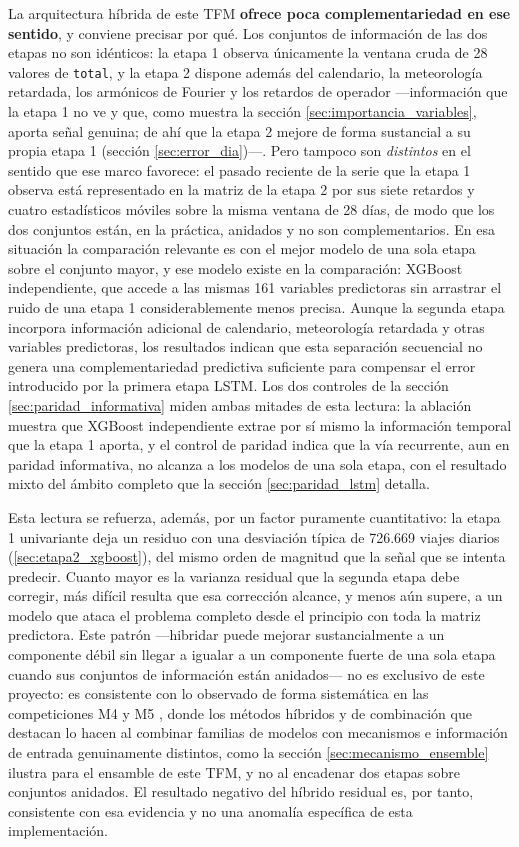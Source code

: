 La arquitectura híbrida de este TFM \textbf{ofrece poca complementariedad en ese sentido},
y conviene precisar por qué. Los conjuntos de información de las dos etapas no son
idénticos: la etapa 1 observa únicamente la ventana cruda de 28 valores de \texttt{total},
y la etapa 2 dispone además del calendario, la meteorología retardada, los armónicos de
Fourier y los retardos de operador —información que la etapa 1 no ve y que, como muestra
la sección \ref{sec:importancia_variables}, aporta señal genuina; de ahí que la etapa 2
mejore de forma sustancial a su propia etapa 1 (sección \ref{sec:error_dia})—. Pero
tampoco son \emph{distintos} en el sentido que ese marco favorece: el pasado reciente de la
serie que la etapa 1 observa está representado en la matriz de la etapa 2 por sus siete
retardos y cuatro estadísticos móviles sobre la misma ventana de 28 días, de modo que los
dos conjuntos están, en la práctica, anidados y no son complementarios. En esa situación la
comparación relevante es con el mejor modelo de una sola etapa sobre el conjunto mayor, y
ese modelo existe en la comparación: XGBoost independiente, que accede a las mismas 161
variables predictoras sin arrastrar el ruido de una etapa 1 considerablemente menos precisa. Aunque la segunda etapa incorpora información adicional de
calendario, meteorología retardada y otras variables predictoras, los resultados indican
que esta separación secuencial no genera una complementariedad predictiva suficiente para
compensar el error introducido por la primera etapa LSTM. Los dos controles de la sección
\ref{sec:paridad_informativa} miden ambas mitades de esta lectura: la ablación muestra que
XGBoost independiente extrae por sí mismo la información temporal que la etapa 1 aporta,
y el control de paridad indica que la vía recurrente, aun en paridad informativa, no
alcanza a los modelos de una sola etapa, con el resultado mixto del ámbito completo que la
sección \ref{sec:paridad_lstm} detalla.

Esta lectura se refuerza, además, por un factor puramente cuantitativo: la etapa 1
univariante deja un residuo con una desviación típica de 726.669 viajes diarios
(\ref{sec:etapa2_xgboost}), del mismo orden de magnitud que la señal que se intenta
predecir. Cuanto mayor es la varianza residual que la segunda etapa debe corregir, más
difícil resulta que esa corrección alcance, y menos aún supere, a un modelo que ataca el
problema completo desde el principio con toda la matriz predictora. Este patrón —hibridar
puede mejorar sustancialmente a un componente débil sin llegar a igualar a un componente
fuerte de una sola etapa cuando sus conjuntos de información están anidados— no es
exclusivo de este proyecto: es consistente con lo observado de forma sistemática en las
competiciones M4 y M5 \parencite{makridakis2018m4,makridakis2022m5}, donde los métodos
híbridos y de combinación que destacan lo hacen al combinar familias de modelos con
mecanismos e información de entrada genuinamente distintos, como la sección
\ref{sec:mecanismo_ensemble} ilustra para el ensamble de este TFM, y no al encadenar dos
etapas sobre conjuntos anidados. El resultado negativo del híbrido residual es, por tanto,
consistente con esa evidencia y no una anomalía específica de esta implementación.

